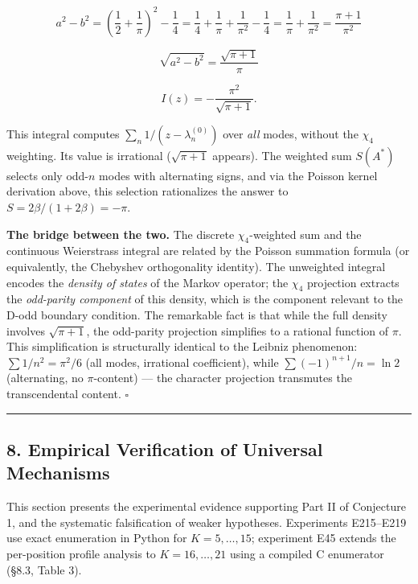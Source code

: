 \documentclass[
  11pt,
]{article}
\begin{document}
\[a^2 - b^2 = \left(\frac{1}{2} + \frac{1}{\pi}\right)^{\!2} - \frac{1}{4} = \frac{1}{4} + \frac{1}{\pi} + \frac{1}{\pi^2} - \frac{1}{4} = \frac{1}{\pi} + \frac{1}{\pi^2} = \frac{\pi + 1}{\pi^2}\]

\[\sqrt{a^2 - b^2} = \frac{\sqrt{\pi+1}}{\pi}\]

\[I(z) = -\frac{\pi^2}{\sqrt{\pi+1}}.\]

This integral computes \(\sum_n 1/(z - \lambda_n^{(0)})\) over \emph{all} modes,
without the \(\chi_4\) weighting. Its value is irrational (\(\sqrt{\pi+1}\)
appears). The weighted sum \(S(A^{\ast})\) selects only odd-\(n\) modes with
alternating signs, and via the Poisson kernel derivation above, this selection
rationalizes the answer to \(S = 2\beta/(1+2\beta) = -\pi\).

\textbf{The bridge between the two.} The discrete \(\chi_4\)-weighted sum and
the continuous Weierstrass integral are related by the Poisson summation formula
(or equivalently, the Chebyshev orthogonality identity). The unweighted integral
encodes the \emph{density of states} of the Markov operator; the \(\chi_4\)
projection extracts the \emph{odd-parity component} of this density, which is
the component relevant to the D-odd boundary condition. The remarkable fact is
that while the full density involves \(\sqrt{\pi+1}\), the odd-parity projection
simplifies to a rational function of \(\pi\). This simplification is
structurally identical to the Leibniz phenomenon: \(\sum 1/n^2 = \pi^2/6\) (all
modes, irrational coefficient), while \(\sum (-1)^{n+1}/n = \ln 2\)
(alternating, no \(\pi\)-content) --- the character projection transmutes the
transcendental content. \(\square\)

\begin{center}\rule{0.5\linewidth}{0.5pt}\end{center}

\newpage

\subsection{8. Empirical Verification of Universal
Mechanisms}\label{empirical-verification-of-universal-mechanisms}

This section presents the experimental evidence supporting Part II of Conjecture
1, and the systematic falsification of weaker hypotheses. Experiments E215--E219
use exact enumeration in Python for \(K = 5, \ldots, 15\); experiment E45
extends the per-position profile analysis to \(K = 16, \ldots, 21\) using a
compiled C enumerator (§8.3, Table 3).
\end{document}
